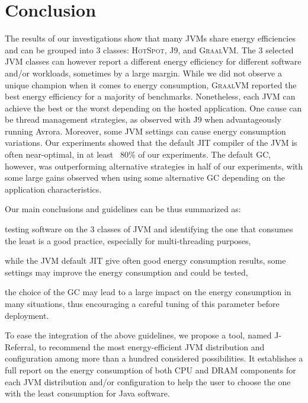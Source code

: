 \section{Conclusion}
The results of our investigations show that many JVMs share energy efficiencies and can be grouped into 3 classes: \textsc{HotSpot}, J9, and \textsc{GraalVM}.
The 3 selected JVM classes can however report a different energy efficiency for different software and/or workloads, sometimes by a large margin.
While we did not observe a unique champion when it comes to energy consumption, \textsc{GraalVM} reported the best energy efficiency for a majority of benchmarks.
Nonetheless, each JVM can achieve the best or the worst depending on the hosted application.
One cause can be thread management strategies, as observed with J9 when advantageously running \textsf{Avrora}.
Moreover, some JVM settings can cause energy consumption variations.
Our experiments showed that the default JIT compiler of the JVM is often near-optimal, in at least ~80\% of our experiments.
The default GC, however, was outperforming alternative strategies in half of our experiments, with some large gains observed when using some alternative GC depending on the application characteristics.

Our main conclusions and guidelines can be thus summarized as:
\begin{inparaenum}[\em i)]
    \item testing software on the 3 classes of JVM and identifying the one that consumes the least is a good practice, especially for multi-threading purposes,
    \item while the JVM default JIT give often good energy consumption results, some settings may improve the energy consumption and could be tested,
    \item the choice of the GC may lead to a large impact on the energy consumption in many situations, thus encouraging a careful tuning of this parameter before deployment.
\end{inparaenum}
To ease the integration of the above guidelines, we propose a tool, named \textsf{J-Referral}, to recommend the most energy-efficient JVM distribution and configuration among more than a hundred considered possibilities.
It establishes a full report on the energy consumption of both CPU and DRAM components for each JVM distribution and/or configuration to help the user to choose the one with the least consumption for Java software.
